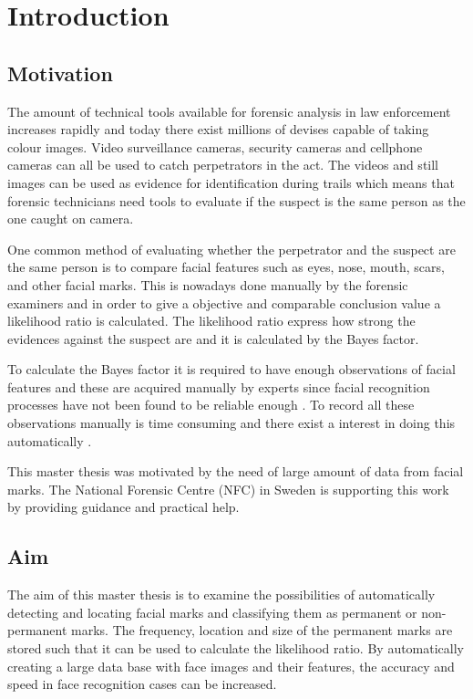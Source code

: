 \chapter{Introduction}\label{cha:intro}
\section{Motivation}
The amount of technical tools available for forensic analysis in law enforcement increases rapidly and today there exist millions of devises capable of taking colour images. Video surveillance cameras, security cameras and cellphone cameras can all be used to catch perpetrators in the act. The videos and still images can be used as evidence for identification during trails which means that forensic technicians need tools to evaluate if the suspect is the same person as the one caught on camera.

One common method of evaluating whether the perpetrator and the suspect are the same person is to compare facial features such as eyes, nose, mouth, scars, and other facial marks. This is nowadays done manually \cite{face_soft} by the forensic examiners and in order to give a objective and comparable conclusion value a likelihood ratio \cite{NFC_stat} is calculated. The likelihood ratio express how strong the evidences against the suspect are and it is calculated by the Bayes factor.

To calculate the Bayes factor it is required to have enough observations of facial features and these are acquired manually by experts since facial recognition processes have not been found to be reliable enough \cite{automatic_detector_2015}. To record all these observations manually is time consuming and there exist a interest in doing this automatically \cite{forensic_identification}. 

This master thesis was motivated by the need of large amount of data from facial marks. The National Forensic Centre (NFC) in Sweden is supporting this work by providing guidance and practical help.  

\section{Aim}

The aim of this master thesis is to examine the possibilities of automatically detecting and locating facial marks and classifying them as permanent or non-permanent marks. The frequency, location and size of the permanent marks are stored such that it can be used to calculate the likelihood ratio. By automatically creating a large data base with face images and their features, the accuracy and speed in face recognition cases can be increased. 

